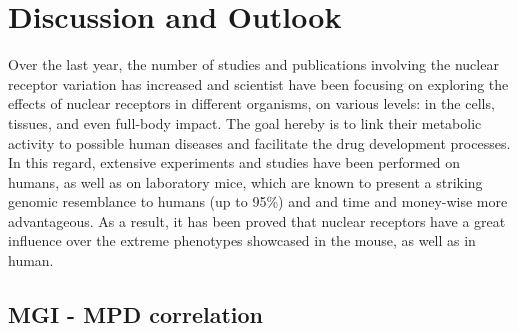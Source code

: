 \documentclass[fleqn,11pt]{SelfArx}
\begin{document}
\section{Discussion and Outlook}

Over the last year, the number of studies and publications involving the nuclear receptor variation has increased and scientist have been focusing on exploring the effects of nuclear receptors in different organisms, on various levels: in the cells, tissues, and even full-body impact. The goal hereby is to link their metabolic activity to possible human diseases and facilitate the drug development processes. In this regard, extensive experiments and studies have been performed on humans, as well as on laboratory mice, which are known to present a striking genomic resemblance to humans (up to 95\%) and and time and money-wise more advantageous. As a result, it has been proved that nuclear receptors have a great influence over the extreme phenotypes showcased in the mouse, as well as in human.
 
\subsection{MGI - MPD correlation}
\end{document}
